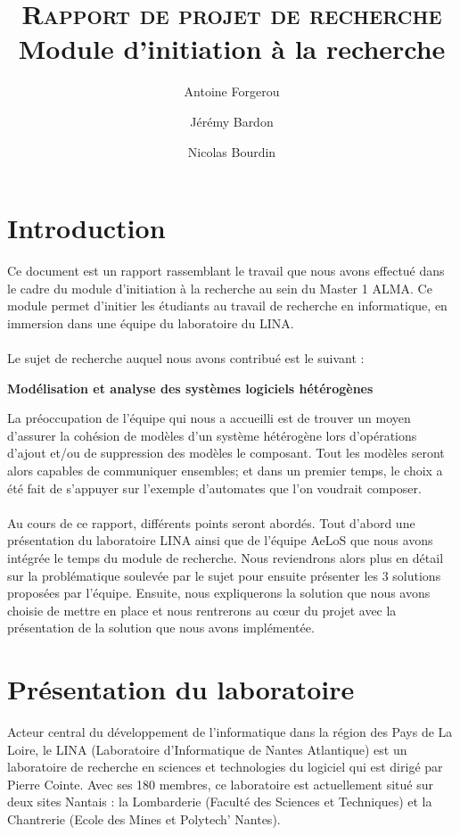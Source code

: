\documentclass[12pt,a4paper]{report}
\title{\textsc{Rapport de projet de recherche}\\Module d'initiation à la recherche}
\author{Antoine Forgerou \and Jérémy Bardon \and Nicolas Bourdin}
\date{}
\begin{document}
	\renewcommand{\contentsname}{Sommaire}
	\maketitle	

	\tableofcontents	
	\newpage
	
	\setlength{\unitlength}{1cm}
	
	
\chapter{Introduction}
Ce document est un rapport rassemblant le travail que nous avons effectué dans le cadre du module 
d'initiation à la recherche au sein du Master 1 ALMA. Ce module permet d'initier 
les étudiants au travail de recherche en informatique, en immersion dans une équipe
du laboratoire du LINA. 
\\\\
Le sujet de recherche auquel nous avons contribué est le suivant : 

\begin{center}
	  \textbf{Modélisation et analyse des systèmes logiciels hétérogènes}
\end{center}

La préoccupation de l'équipe qui nous a accueilli est de trouver un moyen d'assurer la cohésion 
de modèles d'un système
hétérogène lors d'opérations d'ajout et/ou de suppression des modèles le composant. 
Tout les modèles seront alors capables de communiquer ensembles; et dans un premier temps, 
le choix a été fait de s'appuyer sur l'exemple d'automates que l'on voudrait composer.
\\\\
Au cours de ce rapport, différents points seront abordés. Tout d'abord une 
présentation du laboratoire LINA ainsi que de l'équipe AeLoS que nous avons intégrée le 
temps du module de recherche. Nous reviendrons alors plus en détail sur la 
problématique soulevée par le sujet pour ensuite présenter les 3 solutions proposées
par l'équipe. Ensuite, nous expliquerons la solution que nous avons choisie de mettre 
en place et nous rentrerons au cœur du projet avec la présentation de la solution
que nous avons implémentée.	

\chapter{Présentation du laboratoire}
Acteur central du développement de l'informatique dans la région des Pays de La Loire, le LINA (Laboratoire d'Informatique de Nantes Atlantique) est un laboratoire de recherche en sciences et technologies du logiciel qui est dirigé par Pierre Cointe. Avec ses 180 membres, ce laboratoire est actuellement situé sur deux sites Nantais : la Lombarderie (Faculté des Sciences et Techniques) et la Chantrerie (Ecole des Mines et Polytech' Nantes).
\end{document}
